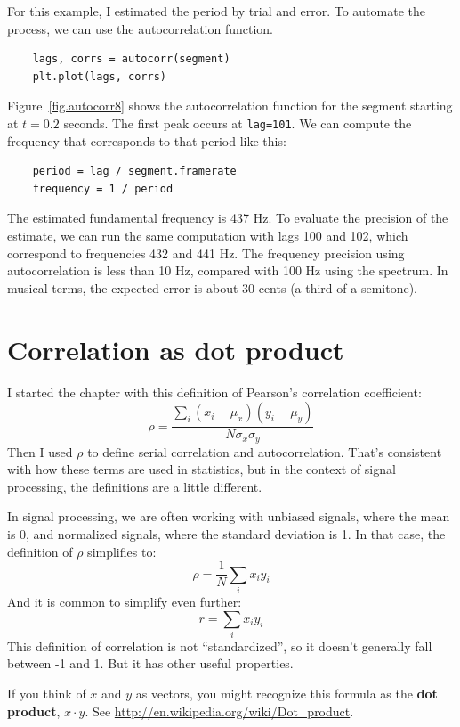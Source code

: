 \documentclass[12pt]{book}
\begin{document}
For this example, I estimated the period by trial and error.  To automate
the process, we can use the autocorrelation function.

\begin{verbatim}
    lags, corrs = autocorr(segment)
    plt.plot(lags, corrs)
\end{verbatim}

Figure~\ref{fig.autocorr8} shows the autocorrelation function for
the segment starting at $t=0.2$ seconds.  The first peak occurs at
{\tt lag=101}.  We can compute the frequency that corresponds
to that period like this:

\begin{verbatim}
    period = lag / segment.framerate
    frequency = 1 / period
\end{verbatim}

The estimated fundamental frequency is 437 Hz.  To evaluate the
precision of the estimate, we can run the same computation with
lags 100 and 102, which correspond to frequencies 432 and 441 Hz.
The frequency precision using autocorrelation is less than 10 Hz,
compared with 100 Hz using the spectrum.  In musical terms, the
expected error is about 30 cents (a third of a semitone).


\section{Correlation as dot product}
\label{dotproduct}

I started the chapter with this definition of Pearson's
correlation coefficient:
%
\[ \rho = \frac{ \sum_i (x_i - \mu_x) (y_i - \mu_y)}{N \sigma_x \sigma_y} \]
%
Then I used $\rho$ to define serial correlation and autocorrelation.
That's consistent with how these terms are used in statistics,
but in the context of signal processing, the definitions are
a little different.

In signal processing, we are often working with unbiased signals,
where the mean is 0, and normalized signals, where the standard
deviation is 1.  In that case, the definition of $\rho$ simplifies to:
%
\[ \rho = \frac{1}{N} \sum_i x_i y_i \]
%
And it is common to simplify even further:
%
\[ r = \sum_i x_i y_i \]
%
This definition of correlation is not ``standardized'', so it doesn't
generally fall between -1 and 1.  But it has other useful properties.

If you think of $x$ and $y$ as vectors, you might recognize this
formula as the {\bf dot product}, $x \cdot y$.  See
\url{http://en.wikipedia.org/wiki/Dot_product}.
\end{document}
